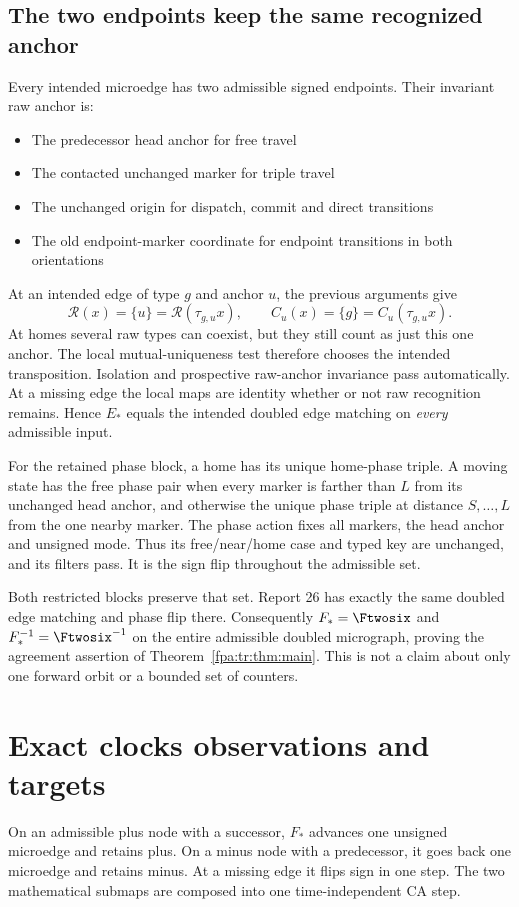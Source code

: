 \documentclass[11pt,a4paper]{article}
\numberwithin{equation}{section}
\newcommand{\Estar}{E_*}\newcommand{\Fstar}{F_*}
\newcommand{\Rec}{\mathcal R}\newcommand{\Sel}{\mathcal S}
\begin{document}
\subsection{The two endpoints keep the same recognized anchor}
Every intended microedge has two admissible signed endpoints. Their invariant raw anchor is:
\begin{itemize}
\item The predecessor head anchor for free travel
\item The contacted unchanged marker for triple travel
\item The unchanged origin for dispatch, commit and direct transitions
\item The old endpoint-marker coordinate for endpoint transitions in both orientations
\end{itemize}
At an intended edge of type $g$ and anchor $u$, the previous arguments give
\[
\Rec(x)=\{u\}=\Rec(\tau_{g,u}x),\qquad
C_u(x)=\{g\}=C_u(\tau_{g,u}x).
\]
At homes several raw types can coexist, but they still count as just this one anchor. The local mutual-uniqueness test therefore chooses the intended transposition. Isolation and prospective raw-anchor invariance pass automatically. At a missing edge the local maps are identity whether or not raw recognition remains. Hence $\Estar$ equals the intended doubled edge matching on \emph{every} admissible input.

For the retained phase block, a home has its unique home-phase triple. A moving state has the free phase pair when every marker is farther than $L$ from its unchanged head anchor, and otherwise the unique phase triple at distance $S,\ldots,L$ from the one nearby marker. The phase action fixes all markers, the head anchor and unsigned mode. Thus its free/near/home case and typed key are unchanged, and its filters pass. It is the sign flip throughout the admissible set.

Both restricted blocks preserve that set. Report 26 has exactly the same doubled edge matching and phase flip there. Consequently $\Fstar=\Ftwosix$ and $\Fstar^{-1}=\Ftwosix^{-1}$ on the entire admissible doubled micrograph, proving the agreement assertion of Theorem~\ref{fpa:tr:thm:main}. This is not a claim about only one forward orbit or a bounded set of counters.
\section{Exact clocks observations and targets}\label{fpa:tr:sec:clocks}
On an admissible plus node with a successor, $\Fstar$ advances one unsigned microedge and retains plus. On a minus node with a predecessor, it goes back one microedge and retains minus. At a missing edge it flips sign in one step. The two mathematical submaps are composed into one time-independent CA step.
\end{document}
